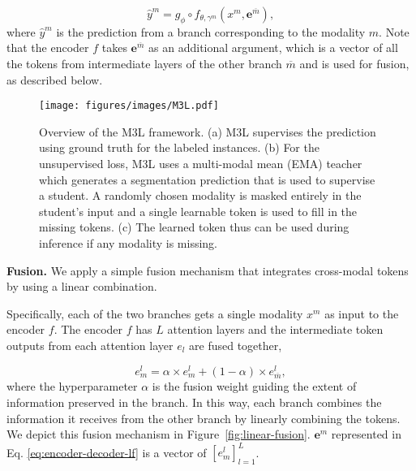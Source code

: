 \documentclass[10pt,twocolumn,letterpaper]{article}
\begin{document}
\begin{equation}
\hat{y}^m = g_\phi \circ f_{\theta, \gamma^m}(x^m, \mathbf{e}^{\overline{m}}),
\label{eq:encoder-decoder-lf}
\end{equation}
 where $\hat{y}^m$ is the prediction from a branch corresponding to the modality $m$. Note that the encoder $f$ takes $\mathbf{e}^{\overline{m}}$ as an additional argument, which is a vector of all the tokens from intermediate layers of the other branch $\overline{m}$ and is used for fusion, as described below.

\begin{figure*}
\begin{center}
\texttt{[image: figures/images/M3L.pdf]}
\end{center}
\vspace{-5mm}
\caption{Overview of the M3L framework. (a) M3L supervises the prediction using ground truth for the labeled instances. (b) For the unsupervised loss, M3L uses a multi-modal mean (EMA) teacher which generates a segmentation prediction that is used to supervise a student. A randomly chosen modality is masked entirely in the student's input and a single learnable token is used to fill in the missing tokens. (c) The learned token thus can be used during inference if any modality is missing.
}
\label{fig:M3L}
\end{figure*} 
\noindent\textbf{Fusion.} 
We apply a simple fusion mechanism that integrates cross-modal tokens by using a linear combination.

 Specifically, each of the two branches gets a single modality $x^m$ as input to the encoder $f$. The encoder $f$ has $L$ attention layers and the intermediate token outputs from each attention layer $e_l$ are fused together, 

\begin{equation}
     e_m^l = \alpha \times e_m^l + (1-\alpha) \times e_{\overline{m}}^l,
    \label{eq:fusion-lf}
\end{equation} 
where the hyperparameter $\alpha$ is the fusion weight guiding the extent of information preserved in the branch. 
In this way, each branch combines the information it receives from the other branch by linearly combining the tokens. We depict this fusion mechanism in Figure~\ref{fig:linear-fusion}. $\mathbf{e}^{m}$ represented in Eq. \ref{eq:encoder-decoder-lf} is a vector of $[e_m^l]_{l=1}^{L}$. 
\end{document}
